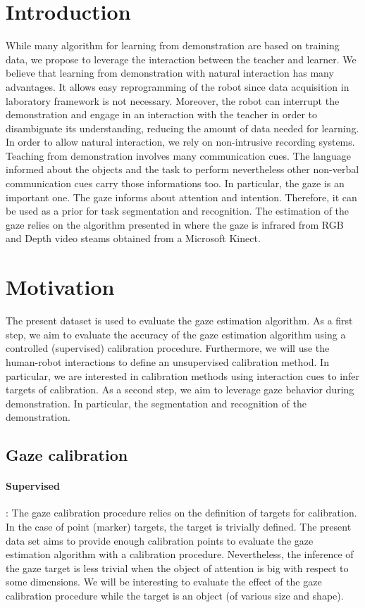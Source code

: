 \documentclass[11pt,a4paper]{article}
\begin{document}
\section{Introduction}
While many algorithm for learning from demonstration are based on training data, we propose to leverage the interaction between the teacher and learner. We believe that learning from demonstration with natural interaction has many advantages. It allows easy reprogramming of the robot since data acquisition in laboratory framework is not necessary. Moreover, the robot can interrupt the demonstration and engage in an interaction with the teacher in order to disambiguate its understanding, reducing the amount of data needed for learning.
\newline
In order to allow natural interaction, we rely on non-intrusive recording systems. Teaching from demonstration involves many communication cues. The language informed about the objects and the task to perform nevertheless other non-verbal communication cues carry those informations too. In particular, the gaze is an important one. 
\newline
The gaze informs about attention and intention. Therefore, it can be used as a prior for task segmentation and recognition. The estimation of the gaze relies on the algorithm presented in \cite{Funes2016} where the gaze is infrared from RGB and Depth video steams obtained from a Microsoft Kinect.

\section{Motivation}
The present dataset is used to evaluate the gaze estimation algorithm. As a first step, we aim to evaluate the accuracy of the gaze estimation algorithm using a controlled (supervised) calibration procedure. Furthermore, we will use the human-robot interactions to define an unsupervised calibration method. In particular, we are interested in calibration methods using interaction cues to infer targets of calibration. As a second step, we aim to leverage gaze behavior during demonstration. In particular, the segmentation and recognition of the demonstration.
\subsection{Gaze calibration}
\paragraph{Supervised}: The gaze calibration procedure relies on the definition of targets for calibration. In the case of point (marker) targets, the target is trivially defined. The present data set aims to provide enough calibration points to evaluate the gaze estimation algorithm with a calibration procedure. Nevertheless, the inference of the gaze target is less trivial when the object of attention is big with respect to some dimensions. We will be interesting to evaluate the effect of the gaze calibration procedure while the target is an object (of various size and shape).
\end{document}
